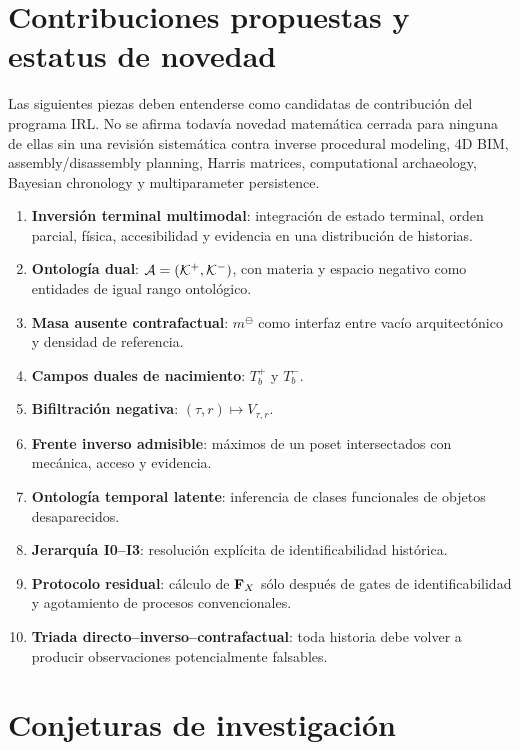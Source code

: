 
\section{Contribuciones propuestas y estatus de novedad}

Las siguientes piezas deben entenderse como candidatas de contribución del programa IRL. No se afirma todavía novedad matemática cerrada para ninguna de ellas sin una revisión sistemática contra inverse procedural modeling, 4D BIM, assembly/disassembly planning, Harris matrices, computational archaeology, Bayesian chronology y multiparameter persistence.

\begin{enumerate}[label=\textbf{C\arabic*.},leftmargin=*]
\item \textbf{Inversión terminal multimodal}: integración de estado terminal, orden parcial, física, accesibilidad y evidencia en una distribución de historias.
\item \textbf{Ontología dual}: \(\mathcal A=(\mathcal K^{+},\mathcal K^{-})\), con materia y espacio negativo como entidades de igual rango ontológico.
\item \textbf{Masa ausente contrafactual}: \(m^\ominus\) como interfaz entre vacío arquitectónico y densidad de referencia.
\item \textbf{Campos duales de nacimiento}: \(T_b^+\) y \(T_b^-\).
\item \textbf{Bifiltración negativa}: \((\tau,r)\mapsto V_{\tau,r}\).
\item \textbf{Frente inverso admisible}: máximos de un poset intersectados con mecánica, acceso y evidencia.
\item \textbf{Ontología temporal latente}: inferencia de clases funcionales de objetos desaparecidos.
\item \textbf{Jerarquía I0--I3}: resolución explícita de identificabilidad histórica.
\item \textbf{Protocolo residual}: cálculo de \(\mathbf F_X\) sólo después de gates de identificabilidad y agotamiento de procesos convencionales.
\item \textbf{Triada directo--inverso--contrafactual}: toda historia debe volver a producir observaciones potencialmente falsables.
\end{enumerate}

\section{Conjeturas de investigación}

